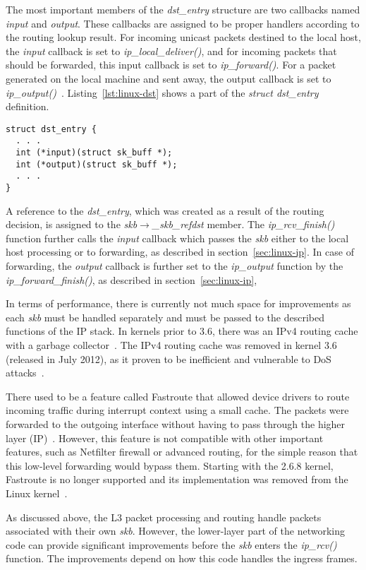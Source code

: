 The most important members of the {\it{dst\_entry}} structure are two callbacks named {\it{input}} and {\it{output}}.
These callbacks are assigned to be proper handlers according to the routing lookup result.
For incoming unicast packets destined to the local host, the {\it{input}} callback is set to
{\it{ip\_local\_deliver()}}, and for incoming packets that should be forwarded,
this input callback is set to {\it{ip\_forward()}}.
For a packet generated on the local machine and sent away,
the output callback is set to {\it{ip\_output()}}~\cite{linux-kernel-networking}.
Listing~\ref{lst:linux-dst} shows a part of the {\it{struct dst\_entry}} definition.
\bigskip
\begin{lstlisting}[caption={Destination callback members of struct dst\_entry},label={lst:linux-dst}]
struct dst_entry {
  . . .
  int (*input)(struct sk_buff *);
  int (*output)(struct sk_buff *);
  . . .
}
\end{lstlisting}

A reference to the {\it{dst\_entry}}, which was created as a result of the routing decision,
is assigned to the {\it{skb$\rightarrow$\_skb\_refdst}} member.
The {\it{ip\_rcv\_finish()}} function further calls the {\it{input}} callback
which passes the {\it{skb}} either to the local host processing or to forwarding, as described in section~\ref{sec:linux-ip}.
In case of forwarding, the {\it{output}} callback is further set to the {\it{ip\_output}} function by the
{\it{ip\_forward\_finish()}}, as described in section~\ref{sec:linux-ip},

In terms of performance, there is currently not much space for improvements as
each {\it{skb}} must be handled separately and must be passed to the described functions of the IP stack.
In kernels prior to 3.6, there was an IPv4 routing cache with a garbage collector~\cite{linux-kernel-networking}.
The IPv4 routing cache was removed in kernel 3.6 (released in July 2012),
as it proven to be inefficient and vulnerable to DoS attacks~\cite{linux-cache-removing}.

There used to be a feature called Fastroute that allowed device drivers to route incoming traffic during
interrupt context using a small cache.
The packets were forwarded to the outgoing interface
without having to pass through the higher layer (IP)~\cite{linux-kernel-networking}.
However, this feature is not compatible with other important features, such as Netfilter firewall or advanced routing,
for the simple reason that this low-level forwarding would bypass them.
Starting with the 2.6.8 kernel, Fastroute is no longer supported and
its implementation was removed from the Linux kernel~\cite{linux-kernel-networking}.

As discussed above, the L3 packet processing and routing handle packets associated with their own {\it{skb}}.
However, the lower-layer part of the networking code can provide significant improvements
before the {\it{skb}} enters the {\it{ip\_rcv()}} function.
The improvements depend on how this code handles the ingress frames.
